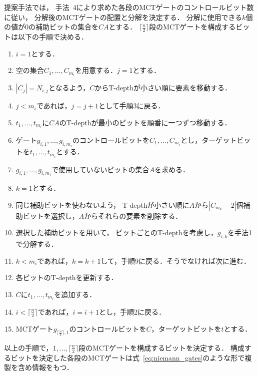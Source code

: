 \par
提案手法では，
手法~4により求めた各段のMCTゲートのコントロールビット数に従い，
分解後のMCTゲートの配置と分解を決定する．
分解に使用できる$k$個の値が0の補助ビットの集合を$CA$とする．
$\lceil \frac{n}{2} \rceil$段のMCTゲートを構成するビットは以下の手順で決める．
\begin{enumerate}[手順1]
  \item $i=1$とする．
  \item 空の集合$C_{1},\dots ,C_{m_{i}}$を用意する．$j=1$とする．
  \item $|C_{j}|=N_{i, j}$となるよう，$C$からT-depthが小さい順に要素を移動する．
  \item $j<m_{i}$であれば，$j=j+1$として手順3に戻る．
  \item $t_{1},\dots, t_{m_{i}}$に$CA$のT-depthが最小のビットを順番に一つずつ移動する．
  \item ゲート$g_{i, 1},\dots, g_{i, m_{i}}$のコントロールビットを$C_{1},\dots, C_{m_{i}}$とし，ターゲットビットを$t_{1},\dots ,t_{m_{i}}$とする．
  \item $g_{i, 1}, \dots ,g_{i, m_{i}}$で使用していないビットの集合$A$を求める．
  \item $k=1$とする．
  \item 同じ補助ビットを使わないよう，
  T-depthが小さい順に$A$から$|C_{m_{k}}-2|$個補助ビットを選択し，$A$からそれらの要素を削除する．
  \item 選択した補助ビットを用いて，
  ビットごとのT-depthを考慮し，$g_{i, k}$を手法1で分解する．
  \item $k < m_{i}$であれば，$k=k+1$して，手順9に戻る．そうでなければ次に進む．
  \item 各ビットのT-depthを更新する．
  \item $C$に$t_{1},\dots, t_{m_{i}}$を追加する．
  \item $i< \lceil \frac{n}{2} \rceil$であれば，$i=i+1$とし，手順2に戻る．
  \item MCTゲート$g_{\lceil \frac{n}{2} \rceil, 1}$のコントロールビットを$C$，ターゲットビットを$t$とする．
\end{enumerate}
以上の手順で，$1,\dots ,\lceil \frac{n}{2} \rceil$段のMCTゲートを構成するビットを決定する．
構成するビットを決定した各段のMCTゲートは式~\ref{eq:niemann_gates}のような形で複製を含め情報をもつ．
